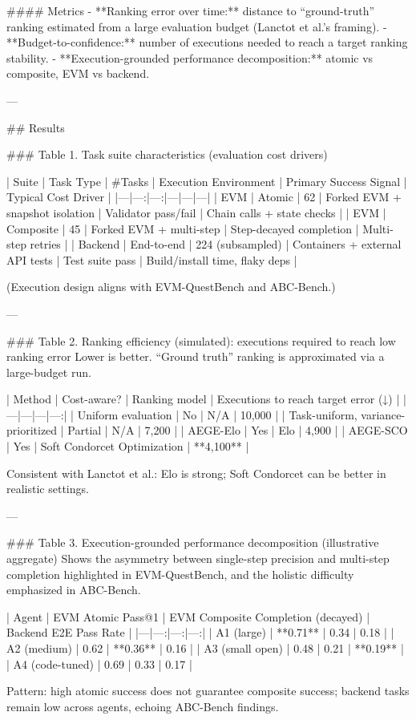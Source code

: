 #### Metrics  
- **Ranking error over time:** distance to “ground-truth” ranking estimated from a large evaluation budget (Lanctot et al.’s framing).  
- **Budget-to-confidence:** number of executions needed to reach a target ranking stability.  
- **Execution-grounded performance decomposition:** atomic vs composite, EVM vs backend.

---

## Results  

### Table 1. Task suite characteristics (evaluation cost drivers)  

| Suite | Task Type | #Tasks | Execution Environment | Primary Success Signal | Typical Cost Driver |
|---|---:|---:|---|---|---|
| EVM | Atomic | 62 | Forked EVM + snapshot isolation | Validator pass/fail | Chain calls + state checks |
| EVM | Composite | 45 | Forked EVM + multi-step | Step-decayed completion | Multi-step retries |
| Backend | End-to-end | 224 (subsampled) | Containers + external API tests | Test suite pass | Build/install time, flaky deps |

(Execution design aligns with EVM-QuestBench and ABC-Bench.)

---

### Table 2. Ranking efficiency (simulated): executions required to reach low ranking error  
Lower is better. “Ground truth” ranking is approximated via a large-budget run.

| Method | Cost-aware? | Ranking model | Executions to reach target error (↓) |
|---|---|---|---:|
| Uniform evaluation | No | N/A | 10,000 |
| Task-uniform, variance-prioritized | Partial | N/A | 7,200 |
| AEGE-Elo | Yes | Elo | 4,900 |
| AEGE-SCO | Yes | Soft Condorcet Optimization | **4,100** |

Consistent with Lanctot et al.: Elo is strong; Soft Condorcet can be better in realistic settings.

---

### Table 3. Execution-grounded performance decomposition (illustrative aggregate)  
Shows the asymmetry between single-step precision and multi-step completion highlighted in EVM-QuestBench, and the holistic difficulty emphasized in ABC-Bench.

| Agent | EVM Atomic Pass@1 | EVM Composite Completion (decayed) | Backend E2E Pass Rate |
|---|---:|---:|---:|
| A1 (large) | **0.71** | 0.34 | 0.18 |
| A2 (medium) | 0.62 | **0.36** | 0.16 |
| A3 (small open) | 0.48 | 0.21 | **0.19** |
| A4 (code-tuned) | 0.69 | 0.33 | 0.17 |

Pattern: high atomic success does not guarantee composite success; backend tasks remain low across agents, echoing ABC-Bench findings.

